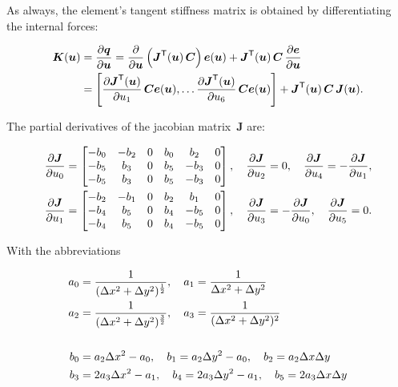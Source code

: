 As always, the element's tangent stiffness matrix is obtained by differentiating the internal forces:

\begin{align}
\boldsymbol{K}(\boldsymbol{u}) &= \frac{\partial \boldsymbol{q}}{\partial \boldsymbol{u}} = \frac{\partial}{\partial \boldsymbol{u}}\left(\boldsymbol{J}^\mathsf{T}(\boldsymbol{u})\,\boldsymbol{C}\right)\boldsymbol{e}(\boldsymbol{u}) + \boldsymbol{J}^\mathsf{T}(\boldsymbol{u})\,\boldsymbol{C}\,\frac{\partial \boldsymbol{e}}{\partial \boldsymbol{u}}\notag\\
&= \left[\frac{\partial \boldsymbol{J}^\mathsf{T}(\boldsymbol{u})}{\partial u_{1}}\,\boldsymbol{C}\boldsymbol{e}(\boldsymbol{u}),\ldots \frac{\partial \boldsymbol{J}^\mathsf{T}(\boldsymbol{u})}{\partial u_{6}}\,\boldsymbol{C}\boldsymbol{e}(\boldsymbol{u})\right] + \boldsymbol{J}^\mathsf{T}(\boldsymbol{u})\,\boldsymbol{C}\,\boldsymbol{J}(\boldsymbol{u}).
\end{align}

The partial derivatives of the jacobian matrix~$\boldsymbol{J}$ are:

\begin{align}
\frac{\partial \boldsymbol{J}}{\partial u_0} &=
\begin{bmatrix}
-b_{0} & -b_{2} & 0 & b_{0} &  b_{2} & 0\\
-b_{5} &  b_{3} & 0 & b_{5} & -b_{3} & 0\\
-b_{5} &  b_{3} & 0 & b_{5} & -b_{3} & 0
\end{bmatrix},\quad
\frac{\partial \boldsymbol{J}}{\partial u_2} = 0,\quad
\frac{\partial \boldsymbol{J}}{\partial u_4} = -\frac{\partial \boldsymbol{J}}{\partial u_1},\notag\\
\frac{\partial \boldsymbol{J}}{\partial u_1} &=
\begin{bmatrix}
-b_{2} & -b_{1} & 0 & b_{2} &  b_{1} & 0\\
-b_{4} &  b_{5} & 0 & b_{4} & -b_{5} & 0\\
-b_{4} &  b_{5} & 0 & b_{4} & -b_{5} & 0
\end{bmatrix},\quad
\frac{\partial \boldsymbol{J}}{\partial u_3} = -\frac{\partial \boldsymbol{J}}{\partial u_0},\quad
\frac{\partial \boldsymbol{J}}{\partial u_5} = 0.
\end{align}

With the abbreviations

\begin{align}
a_{0} &= \frac{1}{(\Delta x^2 + \Delta y^2)^{\frac{1}{2}}},\quad
a_{1}  = \frac{1}{\Delta x^2 + \Delta y^2}\notag\\
a_{2} &= \frac{1}{(\Delta x^2 + \Delta y^2)^{\frac{3}{2}}},\quad
a_{3}  = \frac{1}{(\Delta x^2 + \Delta y^2)^{2}}\\
\notag\\
b_{0} &= a_{2}\Delta x^2 - a_{0},\quad b_{1} = a_{2}\Delta y^2 - a_{0},\quad b_{2} = a_{2}\Delta x\Delta y\notag\\
b_{3} &= 2a_{3}\Delta x^2 - a_{1},\quad b_{4} = 2a_{3}\Delta y^2 - a_{1},\quad b_{5} = 2a_{3}\Delta x\Delta y
\end{align}

